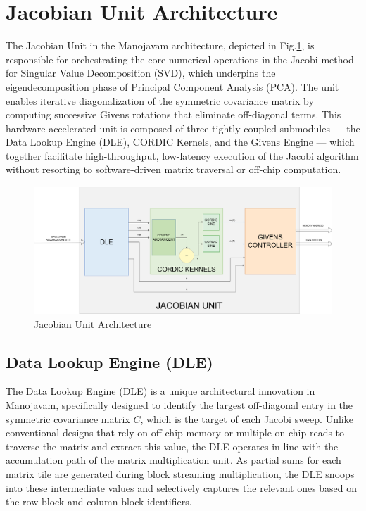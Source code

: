 \section{Jacobian Unit Architecture}
The Jacobian Unit in the Manojavam architecture, depicted in Fig.\ref{fig:jacobian unit architecture}, is responsible for orchestrating the core numerical operations in the Jacobi method for Singular Value Decomposition (SVD), which underpins the eigendecomposition phase of Principal Component Analysis (PCA). The unit enables iterative diagonalization of the symmetric covariance matrix by computing successive Givens rotations that eliminate off-diagonal terms. This hardware-accelerated unit is composed of three tightly coupled submodules — the Data Lookup Engine (DLE), CORDIC Kernels, and the Givens Engine — which together facilitate high-throughput, low-latency execution of the Jacobi algorithm without resorting to software-driven matrix traversal or off-chip computation.

\begin{figure}
	\centerline{\includegraphics[scale = 0.3]{Figures/Jacobian Unit.png}}
	\caption{Jacobian Unit Architecture}
	\label{fig:jacobian unit architecture}
\end{figure}

\subsection{Data Lookup Engine (DLE)}
The Data Lookup Engine (DLE) is a unique architectural innovation in Manojavam, specifically designed to identify the largest off-diagonal entry in the symmetric covariance matrix $C$, which is the target of each Jacobi sweep. Unlike conventional designs that rely on off-chip memory or multiple on-chip reads to traverse the matrix and extract this value, the DLE operates in-line with the accumulation path of the matrix multiplication unit. As partial sums for each matrix tile are generated during block streaming multiplication, the DLE snoops into these intermediate values and selectively captures the relevant ones based on the row-block and column-block identifiers.

